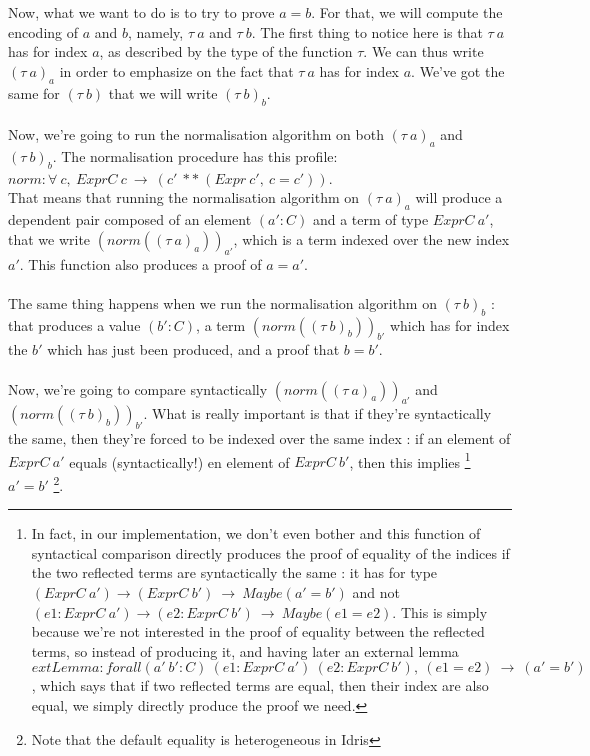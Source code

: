\documentclass{llncs}
\begin{document}
\\
\\
Now, what we want to do is to try to prove $a=b$. For that, we will compute the encoding of $a$ and $b$, namely, $\tau\ a$ and $\tau\ b$.  The first thing to notice here is that $\tau\ a$ has for index $a$, as described by the type of the function $\tau$. We can thus write $(\tau\ a)_a$ in order to emphasize on the fact that $\tau\ a$ has for index $a$. We've got the same for $(\tau\ b)$ that we will write $(\tau\ b)_b$.
\\
\\
Now, we're going to run the normalisation algorithm on both $(\tau\ a)_a$ and $(\tau\ b)_b$. The normalisation procedure has this profile: \\
$norm : \forall\ c,\ ExprC\ c\ \rightarrow\ (c'\ **\ (Expr\ c',\ c=c'))$. \\
That means that running the normalisation algorithm on $(\tau\ a)_a$ will produce a dependent pair composed of an element $(a':C)$ and a term of type $ExprC \ a'$, that we write $(norm((\tau\ a)_a))_{a'}$, which is a term indexed over the new index $a'$. This function also produces a proof of $a=a'$.
\\
\\
The same thing happens when we run the normalisation algorithm on $(\tau\ b)_b$ : that produces a value $(b':C)$, a term $(norm((\tau\ b)_b))_{b'}$ which has for index the $b'$ which has just been produced, and a proof that $b=b'$.
\\
\\
Now, we're going to compare syntactically $(norm((\tau\ a)_a))_{a'}$ and $(norm((\tau\ b)_b))_{b'}$. What is really important is that if they're syntactically the same, then they're forced to be indexed over the same index : if an element of $ExprC\ a'$ equals (syntactically!) en element of $ExprC\ b'$, then this implies \footnote{In fact, in our implementation, we don't even bother and this function of syntactical comparison directly produces the proof of equality of the indices if the two reflected terms are syntactically the same : it has for type $(ExprC\ a') \rightarrow (ExprC\ b')\ \rightarrow\ Maybe(a'=b')$ and not $(e1:ExprC\ a') \rightarrow (e2:ExprC\ b')\ \rightarrow\ Maybe(e1=e2)$. This is simply because we're not interested in the proof of equality between the reflected terms, so instead of producing it, and having later an external lemma $extLemma:forall (a'\ b':C)\ (e1:ExprC\ a')\ (e2:ExprC\ b'),\ (e1=e2)\ \rightarrow\ (a'=b')$, which says that if two reflected terms are equal, then their index are also equal, we simply directly produce the proof we need.} $a'=b'$ \footnote{Note that the default equality is heterogeneous in Idris}.
\end{document}
